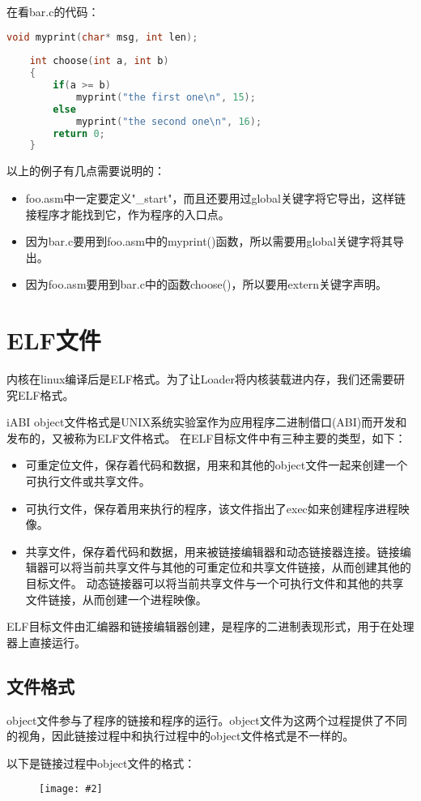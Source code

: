 \documentclass[a4paper,left=2.5cm,right=2.5cm,11pt]{article}
\newcommand{\sizedfic}[2]{\begin{figure}[H]
		\center
		\texttt{[image: \#2]}
	\end{figure}}
\begin{document}
	在看bar.c的代码：
	\begin{lstlisting}[language = C]
	void myprint(char* msg, int len);
	
	int choose(int a, int b)
	{
		if(a >= b)
			myprint("the first one\n", 15);
		else
			myprint("the second one\n", 16);
		return 0;
	}
	\end{lstlisting}

	以上的例子有几点需要说明的：
	\begin{itemize}
		\item foo.asm中一定要定义"\_start"，而且还要用过global关键字将它导出，这样链接程序才能找到它，作为程序的入口点。
		\item 因为bar.c要用到foo.asm中的myprint()函数，所以需要用global关键字将其导出。
		\item 因为foo.asm要用到bar.c中的函数choose()，所以要用extern关键字声明。
	\end{itemize}

\clearpage

\section{ELF文件}
	内核在linux编译后是ELF格式。为了让Loader将内核装载进内存，我们还需要研究ELF格式。\par
	iABI object文件格式是UNIX系统实验室作为应用程序二进制借口(ABI)而开发和发布的，又被称为ELF文件格式。
	在ELF目标文件中有三种主要的类型，如下：
	\begin{itemize}
		\item 可重定位文件，保存着代码和数据，用来和其他的object文件一起来创建一个可执行文件或共享文件。
		\item 可执行文件，保存着用来执行的程序，该文件指出了exec如来创建程序进程映像。
		\item 共享文件，保存着代码和数据，用来被链接编辑器和动态链接器连接。链接编辑器可以将当前共享文件与其他的可重定位和共享文件链接，从而创建其他的目标文件。
		动态链接器可以将当前共享文件与一个可执行文件和其他的共享文件链接，从而创建一个进程映像。
	\end{itemize}

	ELF目标文件由汇编器和链接编辑器创建，是程序的二进制表现形式，用于在处理器上直接运行。

\subsection{文件格式}
	object文件参与了程序的链接和程序的运行。object文件为这两个过程提供了不同的视角，因此链接过程中和执行过程中的object文件格式是不一样的。\par
	以下是链接过程中object文件的格式：
	\sizedfic{0.4}{7.png}
\end{document}
